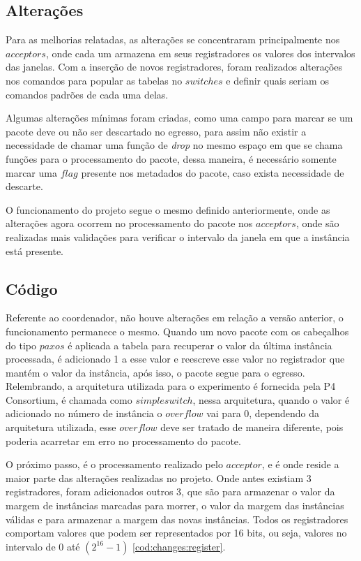 \documentclass[
    12pt,
    openright, 
    oneside,
    a4paper,
    french,
    english,
    brazil
    ]{facom-ufu-abntex2}
\theoremstyle{definition}
\begin{document}
\subsection{Alterações}
Para as melhorias relatadas, as alterações se concentraram principalmente nos $acceptors$, onde cada um armazena 
em seus registradores os valores dos intervalos das janelas. Com a inserção de novos registradores, foram
realizados alterações nos comandos para popular as tabelas no $switches$ e definir quais seriam os comandos padrões
de cada uma delas.

Algumas alterações mínimas foram criadas, como uma campo para marcar se um pacote deve ou não ser descartado no egresso,
para assim não existir a necessidade de chamar uma função de \textit{drop} no mesmo espaço em que se chama funções para o
processamento do pacote, dessa maneira, é necessário somente marcar uma $flag$ presente nos metadados do pacote,
caso exista necessidade de descarte.

O funcionamento do projeto segue o mesmo definido anteriormente, onde as alterações agora ocorrem no processamento
do pacote nos $acceptors$, onde são realizadas mais validações para verificar o intervalo da janela em que a instância
está presente.

\subsection{Código}
Referente ao coordenador, não houve alterações em relação a versão anterior, o funcionamento permanece o mesmo.
Quando um novo pacote com os cabeçalhos do tipo $paxos$ é aplicada a tabela para recuperar o valor da última instância
processada, é adicionado 1 a esse valor e reescreve esse valor no registrador que mantém o valor da instância, após isso,
o pacote segue para o egresso. Relembrando, a arquitetura utilizada para o experimento é fornecida pela P4 Consortium, é
chamada como $simple switch$, nessa arquitetura, quando o valor é adicionado no número de instância o $overflow$ vai para
0, dependendo da arquitetura utilizada, esse $overflow$ deve ser tratado de maneira diferente, pois poderia acarretar em
erro no processamento do pacote.



O próximo passo, é o processamento realizado pelo $acceptor$, e é onde reside a maior parte das alterações realizadas no projeto.
Onde antes existiam 3 registradores, foram adicionados outros 3, que são para armazenar o valor da margem de instâncias marcadas
para morrer, o valor da margem das instâncias válidas e para armazenar a margem das novas instâncias. Todos os registradores
comportam valores que podem ser representados por 16 bits, ou seja, valores no intervalo de 0 até $(2^{16} - 1)$ \ref{cod:changes:register}.
\end{document}
